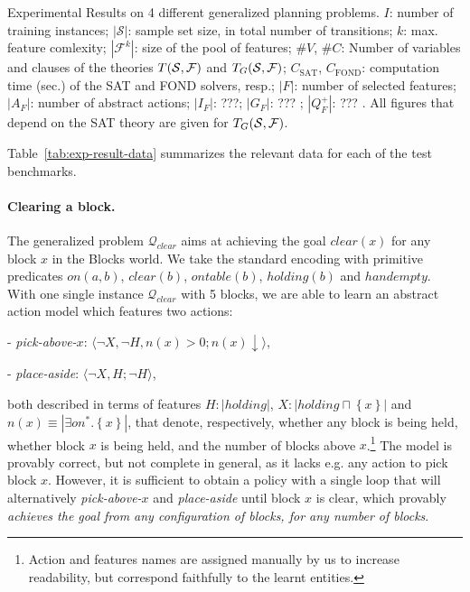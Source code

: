 \documentclass[letterpaper]{article} %
\newcommand{\tuple}[1]{\ensuremath{\langle #1 \rangle}}
\newcommand{\set}[1]{\ensuremath{\left\{#1 \right\}}}
\newcommand{\abs}[1]{\ensuremath{\left\vert{#1}\right\vert}}
\newcommand{\Q}{\mathcal{Q}}
\begin{document}
\begin{table*}[t]
{}
\caption{{
  Experimental Results on 4 different generalized planning problems. 
  $I$: number of training instances; 
  $\abs{\mathcal{S}}$: sample set size, in total number of transitions; 
  $k$: max. feature comlexity; $\abs{\mathcal{F}^k}$: size of the pool of features;
  $\#V$, $\#C$: Number of variables and clauses of the theories $T({\cal S},{\cal F})$ and $T_G({\cal S},{\cal F})$;
  $C_{\text{SAT}}$, $C_{\text{FOND}}$: computation time (sec.) of the SAT and FOND solvers, resp.;
  $\abs{F}$: number of selected features;
  $\abs{A_F}$: number of abstract actions;
  $\abs{I_F}$: ???;
  $\abs{G_F}$: ??? ;
  $\abs{Q^+_F}$: ??? .
  All figures that depend on the SAT theory are given for $T_G({\cal S},{\cal F})$.
}}
\label{tab:exp-result-data}
\end{table*}


Table~\ref{tab:exp-result-data} summarizes the relevant data for each of the test benchmarks.


\paragraph{Clearing a block.}
The generalized problem $\Q_{clear}$ aims at achieving the goal $clear(x)$ for any block $x$
in the Blocks world. 
We take the standard encoding with primitive predicates $on(a, b)$, $clear(b)$, $ontable(b)$, $holding(b)$ and $handempty$.
%
With one single instance $\Q_{clear}$ with 5 blocks, we are able to learn
an abstract action model which features two actions:

- \emph{pick-above-$x$}: \tuple{\neg X, \neg H, n(x) > 0; n(x) \downarrow},

- \emph{place-aside}: \tuple{\neg X, H; \neg H},

\noindent both described in terms of features $H: \abs{holding}$, $X: \abs{holding \sqcap \set{x}}$ and $n(x)\equiv \abs{\exists on^* . \set{x}}$, 
that denote, respectively, whether any block is being held, whether block $x$ is being held,
and the number of blocks above $x$.\footnote{
Action and features names are assigned manually by us to increase readability, but correspond faithfully
to the learnt entities.
}
%
The model is provably correct, but not complete in general, as it lacks e.g.
any action to pick block $x$.
However, it is sufficient to obtain a policy with a single loop that will 
alternatively \emph{pick-above-$x$} and \emph{place-aside} until block $x$ is clear,
which provably \emph{achieves the goal from any configuration of blocks, for any number of blocks}.
\end{document}
